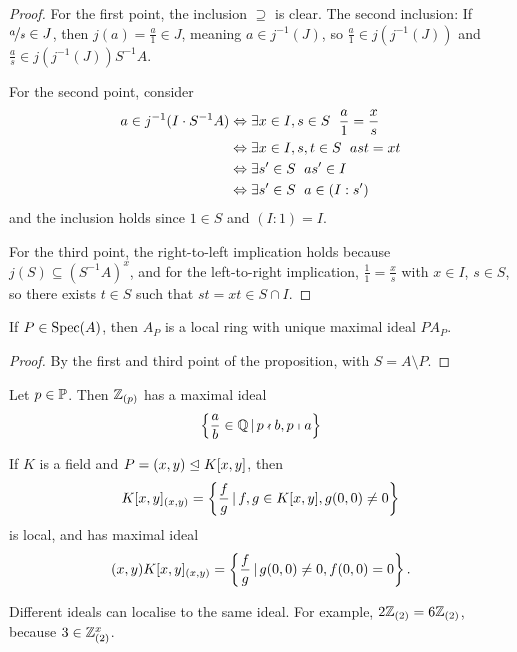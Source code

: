 \begin{proof}
  For the first point, the inclusion $\supseteq$ is clear.
  The second inclusion:
  If $\nicefrac{a}{s} \in J$, then $j(a) = \frac{a}{1} \in J$, meaning $a \in
  j^{-1}(J)$, so $\frac{a}{1} \in j(j^{-1}(J))$ and $\frac{a}{s} \in
  j(j^{-1}(J)) S^{-1}A$.

  For the second point, consider
  \begin{align*}
	a \in j^{-1}(I \cdot S^{-1} A)
	&\Leftrightarrow \exists x \in I, s \in S \;\  \frac{a}{1} = \frac{x}{s} \\
	&\Leftrightarrow \exists x \in I, s, t \in S \;\  ast = xt \\
	&\Leftrightarrow \exists s' \in S \;\  as' \in I \\
	&\Leftrightarrow \exists s' \in S \;\  a \in (I : s')
  \end{align*}
  and the inclusion holds since $1 \in S$ and $(I:1) = I$.

  For the third point, the right-to-left implication holds because $j(S)
  \subseteq (S^{-1} A)^x$, and for the left-to-right implication, $\frac{1}{1} =
  \frac{x}{s}$ with $x \in I$, $s \in S$, so there exists $t \in S$ such that
  $st = xt \in S \cap I$.
\end{proof}

\begin{corollary}
  If $P \in \operatorname{Spec}(A)$, then $A_P$ is a local ring with unique maximal ideal $P
  A_P$.
\end{corollary}

\begin{proof}
  By the first and third point of the proposition, with $S = A \setminus P$.
\end{proof}

\begin{example}
  Let $p \in \mathbb{P}$.
  Then $\mathbb{Z}_{(p)}$ has a maximal ideal
  \[
	\left\{ \frac{a}{b} \in \mathbb{Q} \,|\, p \nshortmid b, p \shortmid a \right\}
  \]
\end{example}

\begin{example}
  If $K$ is a field and $P =(x,y) \trianglelefteq K[x,y]$, then
  \[
	K[x,y]_{(x,y)} = \left\{ \frac{f}{g} \,|\, f, g \in K[x,y], g(0,0) \ne 0
	\right\}
  \]
  is local, and has maximal ideal
  \[
	(x,y) K[x,y]_{(x,y)} = \left\{ \frac{f}{g} \,|\, g(0,0) \ne 0, f(0,0) = 0
	\right\}.
  \]
\end{example}

\begin{example}
  Different ideals can localise to the same ideal.
  For example, $2 \mathbb{Z}_{(2)} = 6 \mathbb{Z}_{(2)}$, because $3 \in \mathbb{Z}_{(2)}^x$.
\end{example}

